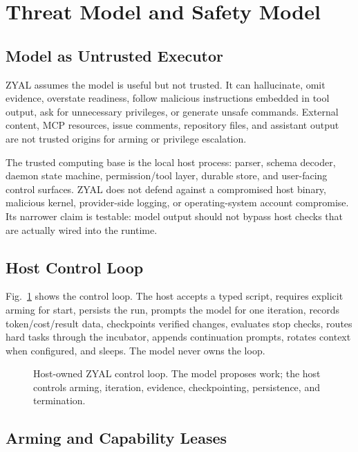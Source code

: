 \documentclass[conference]{IEEEtran}
\newcommand{\ZYAL}{ZYAL}
\begin{document}
\section{Threat Model and Safety Model}

\subsection{Model as Untrusted Executor}

\ZYAL{} assumes the model is useful but not trusted. It can hallucinate, omit evidence, overstate readiness, follow malicious instructions embedded in tool output, ask for unnecessary privileges, or generate unsafe commands. External content, MCP resources, issue comments, repository files, and assistant output are not trusted origins for arming or privilege escalation.

The trusted computing base is the local host process: parser, schema decoder, daemon state machine, permission/tool layer, durable store, and user-facing control surfaces. \ZYAL{} does not defend against a compromised host binary, malicious kernel, provider-side logging, or operating-system account compromise. Its narrower claim is testable: model output should not bypass host checks that are actually wired into the runtime.

\subsection{Host Control Loop}

Fig.~\ref{fig:host-loop} shows the control loop. The host accepts a typed script, requires explicit arming for start, persists the run, prompts the model for one iteration, records token/cost/result data, checkpoints verified changes, evaluates stop checks, routes hard tasks through the incubator, appends continuation prompts, rotates context when configured, and sleeps. The model never owns the loop.

\begin{figure}[t]
\centering
\resizebox{\textwidth}{!}{}
\caption{Host-owned \ZYAL{} control loop. The model proposes work; the host controls arming, iteration, evidence, checkpointing, persistence, and termination.}
\label{fig:host-loop}
\end{figure}

\subsection{Arming and Capability Leases}
\end{document}
